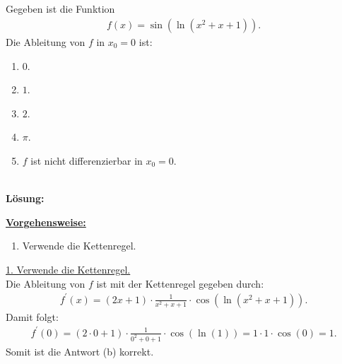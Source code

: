 \newpage
\subsection*{}
Gegeben ist die Funktion
\begin{align*}
	f(x) = \sin(\ln(x^2 + x + 1)).
\end{align*}
Die Ableitung von $f$ in $x_0 = 0 $ ist:
\renewcommand{\labelenumi}{(\alph{enumi})}
\begin{enumerate}
	\item 
	$ 0$.
	\item
	$ 1 $.
	\item
	$ 2 $.
	\item
	$ \pi $.
	\item
	$f$ ist nicht differenzierbar in $x_0 = 0$.
\end{enumerate}
\ \\
\textbf{Lösung:}
\begin{mdframed}
\underline{\textbf{Vorgehensweise:}}
\renewcommand{\labelenumi}{\theenumi.}
\begin{enumerate}
\item Verwende die Kettenregel.
\end{enumerate}
\end{mdframed}
\underline{1. Verwende die Kettenregel.}\\
Die Ableitung von $f$ ist mit der Kettenregel gegeben durch:
\begin{align*}
	f^\prime(x) = (2x +1) \cdot \frac{1}{x^2 +x +1 } \cdot  \cos (\ln(x^2 + x +1)).
\end{align*}
Damit folgt:
\begin{align*}
	f^\prime(0)  =(2\cdot 0 +1 ) \cdot \frac{1}{0^2 + 0 +1} \cdot \cos(\ln(1))
	= 1 \cdot 1 \cdot \cos(0) = 1.
\end{align*}
Somit ist die Antwort (b) korrekt.

\newpage
